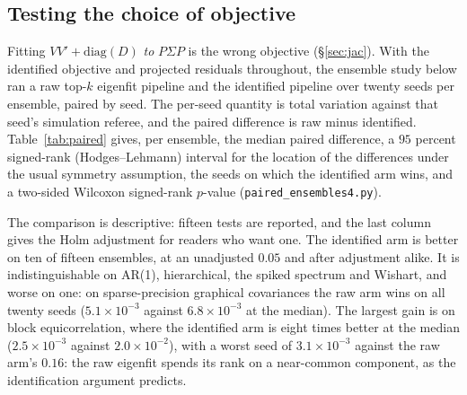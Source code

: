 \documentclass[11pt]{article}
\begin{document}
\subsection{Testing the choice of objective}

Fitting
$VV'+\mathrm{diag}(D)$ \emph{to} $P\Sigma P$ is the wrong
objective (\S\ref{sec:jac}). With the identified objective and projected residuals throughout, the ensemble
study below ran a raw top-$k$ eigenfit pipeline and the identified
pipeline over twenty seeds per ensemble, paired by seed. The per-seed
quantity is total variation against that seed's simulation referee, and
the paired difference is raw minus identified. Table~\ref{tab:paired}
gives, per ensemble, the median paired difference, a $95$ percent
signed-rank (Hodges--Lehmann) interval for the location of the
differences under the usual symmetry assumption, the seeds on
which the identified arm wins, and a two-sided Wilcoxon signed-rank
$p$-value (\texttt{paired\_ensembles4.py}).

The comparison is descriptive: fifteen tests are reported, and the last
column gives the Holm adjustment for readers who want one. The identified
arm is better on ten of fifteen ensembles, at an unadjusted $0.05$ and
after adjustment alike. It is indistinguishable on AR(1), hierarchical,
the spiked spectrum and Wishart, and
worse on one: on sparse-precision graphical covariances the raw arm wins
on all twenty seeds ($5.1\times10^{-3}$ against $6.8\times10^{-3}$ at the
median). The largest gain is on block equicorrelation, where the
identified arm is eight times better at the median ($2.5\times10^{-3}$
against $2.0\times10^{-2}$), with a worst seed of $3.1\times10^{-3}$
against the raw arm's $0.16$: the raw eigenfit spends its rank on a
near-common component, as the identification argument predicts.
\end{document}

